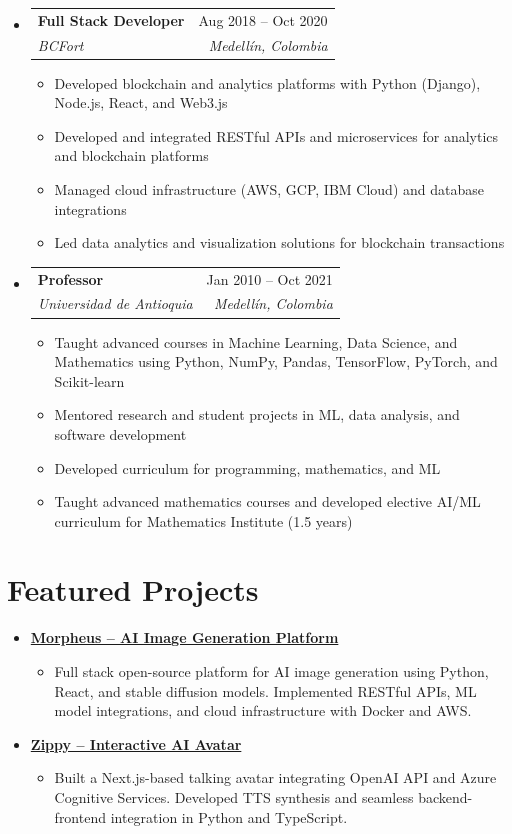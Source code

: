 \documentclass[letterpaper,11pt]{article}
\makeatletter
\newcommand{\resumeSubheading}[4]{
  \vspace{-2pt}
  \item[]
  \begin{tabular*}{\textwidth}{@{\extracolsep{\fill}}l r}
    \textbf{#1} & #2 \\
    \textit{#3} & \textit{#4} \\
  \end{tabular*}
  \vspace{-5pt}
}
\newcommand{\normalfaExternalLink}{{\mdseries\faExternalLink}}
\makeatother
\begin{document}
\begin{itemize}[leftmargin=0pt, itemindent=0pt, label={}, itemsep=1pt]
\resumeSubheading
{Full Stack Developer}{Aug 2018 -- Oct 2020}
{BCFort}{Medellín, Colombia}
\begin{itemize}[leftmargin=*, itemsep=0pt]
    \item Developed blockchain and analytics platforms with Python (Django), Node.js, React, and Web3.js
    \item Developed and integrated RESTful APIs and microservices for analytics and blockchain platforms
    \item Managed cloud infrastructure (AWS, GCP, IBM Cloud) and database integrations
    \item Led data analytics and visualization solutions for blockchain transactions
\end{itemize}

\resumeSubheading
{Professor}{Jan 2010 -- Oct 2021}
{Universidad de Antioquia}{Medellín, Colombia}
\begin{itemize}[leftmargin=*, itemsep=0pt]
    \item Taught advanced courses in Machine Learning, Data Science, and Mathematics using Python, NumPy, Pandas, TensorFlow, PyTorch, and Scikit-learn
    \item Mentored research and student projects in ML, data analysis, and software development
    \item Developed curriculum for programming, mathematics, and ML
    \item Taught advanced mathematics courses and developed elective AI/ML curriculum for Mathematics Institute (1.5 years)
\end{itemize}
\end{itemize}

\section{Featured Projects}
\begin{itemize}[leftmargin=*, itemsep=1pt]
    \item \textbf{\href{https://github.com/Monadical-SAS/Morpheus}{Morpheus -- AI Image Generation Platform \normalfaExternalLink}}
    \begin{itemize}[itemsep=0pt]
        \item Full stack open-source platform for AI image generation using Python, React, and stable diffusion models. Implemented RESTful APIs, ML model integrations, and cloud infrastructure with Docker and AWS.
    \end{itemize}
    \item \textbf{\href{https://github.com/asanchezyali/ai-avatar}{Zippy -- Interactive AI Avatar \normalfaExternalLink}}
    \begin{itemize}[itemsep=0pt]
        \item Built a Next.js-based talking avatar integrating OpenAI API and Azure Cognitive Services. Developed TTS synthesis and seamless backend-frontend integration in Python and TypeScript.
    \end{itemize}
\end{itemize}
\end{document}
